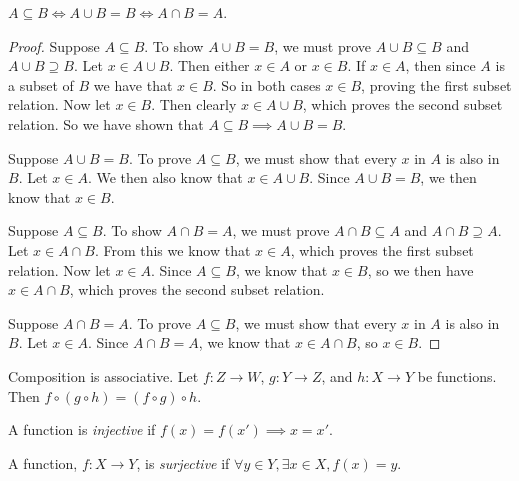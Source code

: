 \documentclass[12pt]{article}
\newenvironment{definition}[2][Definition]{\begin{trivlist}
\item[\hskip \labelsep {\bfseries #1}\hskip \labelsep {\bfseries #2}]}{\end{trivlist}}
\newenvironment{lemma}[2][Lemma]{\begin{trivlist}
\item[\hskip \labelsep {\bfseries #1}\hskip \labelsep {\bfseries #2}]}{\end{trivlist}}
\newenvironment{exercise}[2][Exercise]{\begin{trivlist}
\item[\hskip \labelsep {\bfseries #1}\hskip \labelsep {\bfseries #2}]}{\end{trivlist}}
\begin{document}
\begin{exercise}{3.1.5}
	$ A \subseteq B \iff A \cup B = B \iff A \cap B = A $.
\end{exercise}
\begin{proof}
	Suppose $ A \subseteq B $.
	To show $ A \cup B = B $, we must prove $ A \cup B \subseteq B $ and $ A \cup B \supseteq B $.
	Let $ x \in A \cup B $.
	Then either $ x \in A $ or $ x \in B $.
	If $ x \in A $, then since $ A $ is a subset of $ B $ we have that $ x \in B $. So in both cases $ x \in B $, proving the first subset relation.
	Now let $ x \in B $.
	Then clearly $ x \in A \cup B $, which proves the second subset relation.
	So we have shown that $ A \subseteq B \implies A \cup B = B $.
	
	Suppose $ A \cup B = B $.
	To prove $ A \subseteq B $, we must show that every $ x $ in $ A $ is also in $ B $.
	Let $ x \in A $.
	We then also know that $ x \in A \cup B $.
	Since $ A \cup B = B $, we then know that $ x \in B $.
	
	Suppose $ A \subseteq B $.
	To show $ A \cap B = A $, we must prove $ A \cap B \subseteq A $ and $ A \cap B \supseteq A $.
	Let $ x \in A \cap B $.
	From this we know that $ x \in A $, which proves the first subset relation.
	Now let $ x \in A $.
	Since $ A \subseteq B $, we know that $ x \in B $, so we then have $ x \in A \cap B $, which proves the second subset relation.
	
	Suppose $ A \cap B = A $.
	To prove $ A \subseteq B $, we must show that every $ x $ in $ A $ is also in $ B $.
	Let $ x \in A $.
	Since $ A \cap B = A $, we know that $ x \in A \cap B $, so $ x \in B $.
\end{proof}

\begin{lemma}{3.3.12}
	Composition is associative.
	Let $ f : Z \to W$, $g : Y \to Z $, and $ h : X \to Y $ be functions.
	Then $ f \circ (g \circ h) = (f \circ g) \circ h $.
\end{lemma}

\begin{definition}{3.3.14}
	A function is \textit{injective} if $ f(x) = f(x') \implies x = x' $.
\end{definition}

\begin{definition}{3.3.14}
	A function, $ f: X \to Y $, is \textit{surjective} if $ \forall y \in Y, \exists x \in X, f(x) = y $.
\end{definition}
\end{document}
